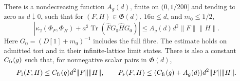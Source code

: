 \documentclass[11pt,letterpaper,reqno]{amsart}
\makeatletter
\theoremstyle{definition}
\newcommand{\ms@minorstart}{%
  \pushQED{\qed}\renewcommand{\qedsymbol}{$\blacksquare$}}
\newenvironment{proposition}[1][]{\ms@minorstart\ms@proposition[#1]}
  {\popQED\endms@proposition}
\theoremstyle{remark}
\makeatother
\begin{document}
\begin{proposition}\label{C-417-7}\label{C-417-8}
There is a nondecreasing function $A_g(d)$, finite on
$(0,1/200]$ and tending to zero as $d\downarrow0$, such that
for $(F,H)\in\mathfrak G(d)$, $16a\le d$, and $m_0\le1/2$,
\begin{equation}\label{eq:qcdm2-matrix-source-comparison}
 \left|\kappa_2(\Phi_F,\Phi_H)
       +a^2\operatorname{Tr}(\hat FG_0\hat HG_0)\right|
       \le A_g(d)d^2\|F\|\|H\|.
\end{equation}
Here $G_0=(D[1]+m_0)^{-1}$ includes the full fibre.
The estimate holds on admitted tori and in their
infinite-lattice limit states.  There is also a constant
$C_{\rm fr}(g)$ such that, for nonnegative scalar pairs
in $\mathfrak G(d)$,
\begin{equation}\label{eq:qcdm2-flat-propagator-bound}
 P_1(F,H)\le C_{\rm fr}(g)d^2\|F\|\|H\|,\qquad
 P_\nu(F,H)\le(C_{\rm fr}(g)+A_g(d))d^2\|F\|\|H\|.
\end{equation}
\end{proposition}
\end{document}
